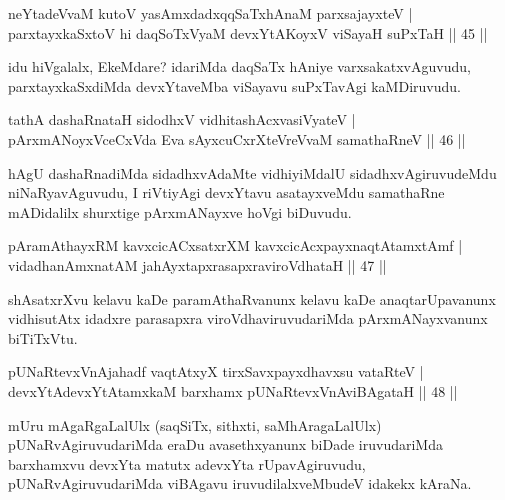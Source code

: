 
\begin{shl}
neYtadeVvaM kutoV yasAmxdadxqqSaTxhAnaM parxsajayxteV  | \\
parxtayxkaSxtoV hi daqSoTxV\s yaM devxYtAKoyxV viSayaH suPxTaH \hfill||  45 ||  
\end{shl}

\begin{artha}
idu hiVgalalx, EkeMdare? idariMda daqSaTx hAniye varxsakatxvAguvudu, parxtayxkaSxdiMda devxYtaveMba viSayavu suPxTavAgi kaMDiruvudu.
\end{artha}

\begin{shl}
tathA dashaRnataH sidodhxV vidhitashAcxvasiVyateV  | \\
pArxmANoyxVceCxVda Eva sAyxcuCxrXteVreVvaM samathaRneV \hfill||  46 ||  
\end{shl}

\begin{artha}
hAgU dashaRnadiMda sidadhxvAdaMte vidhiyiMdalU sidadhxvAgiruvudeMdu niNaRyavAguvudu, I riVtiyAgi devxYtavu asatayxveMdu samathaRne mADidalilx shurxtige pArxmANayxve hoVgi biDuvudu.
\end{artha}


\begin{shl}
pAramAthayxRM kavxcicACxsatxrXM kavxcicAcxpayxnaqtAtamxtAmf  | \\
vidadhanAmxnatAM ja{\null}hAyxtapxrasapxraviroVdhataH \hfill||  47 ||  
\end{shl}

\begin{artha}
shAsatxrXvu kelavu kaDe paramAthaRvanunx kelavu kaDe anaqtarUpavanunx vidhisutAtx idadxre parasapxra viroVdhaviruvudariMda pArxmANayxvanunx biTiTxVtu.
\end{artha}

\begin{shl}
pUNaRtevxVnAja{\null}hadf vaqtAtxyX tirxSavxpayxdhavxsu vataRteV  | \\
devxYtAdevxYtAtamxkaM barxhamx pUNaRtevxVnAviBAgataH \hfill||  48 ||  
\end{shl}

\begin{artha}
mUru mAgaRgaLalUlx (saqSiTx, sithxti, saMhAragaLalUlx) pUNaRvAgiruvudariMda eraDu avasethxyanunx biDade iruvudariMda barxhamxvu devxYta matutx adevxYta rUpavAgiruvudu, pUNaRvAgiruvudariMda viBAgavu iruvudilalxveMbudeV idakekx kAraNa.
\end{artha}

